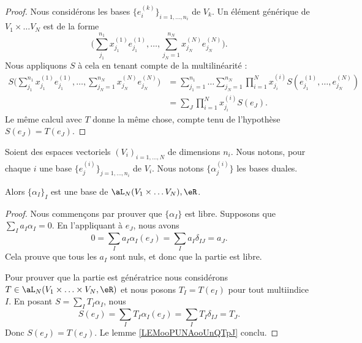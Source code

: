 \begin{proof}
	Nous considérons les bases \( \{ e^{(k)}_i \}_{i=1,\ldots,n_i}\) de \( V_k\). Un élément générique de \( V_1\times \ldots V_N\) est de la forme
	\begin{equation}
		\Big(  \sum_{j_1}^{n_1}x_{j_1}^{(1)}e^{(1)}_{j_1},\ldots, \sum_{j_N=1}^{n_N}x_{j_N}^{(N)}e_{j_N}^{(N)} \Big).
	\end{equation}
	Nous appliquons \( S\) à cela en tenant compte de la multilinéarité :
	\begin{subequations}
		\begin{align}
			S\Big(  \sum_{j_1}^{n_1}x_{j_1}^{(1)}e^{(1)}_{j_1},\ldots, \sum_{j_N=1}^{n_N}x_{j_N}^{(N)}e_{j_N}^{(N)} \Big) & =\sum_{j_1=1}^{n_1}\ldots \sum_{j_N=1}^{n_N}\prod_{i=1}^Nx_{j_i}^{(i)}S(e^{(1)}_{j_1},\ldots,e_{j_N}^{(N)}) \\
			                                                                                                              & =\sum_J\prod_{i=1}^Nx_{j_i}^{(i)}S(e_J).
		\end{align}
	\end{subequations}
	Le même calcul avec \( T\) donne la même chose, compte tenu de l'hypothèse \( S(e_J)=T(e_J)\).
\end{proof}

\begin{theorem}		\label{THOooTAGKooDscwFG}
	Soient des espaces vectoriels \( (V_i)_{i=1,\ldots,N}\) de dimensions \( n_i\). Nous notons, pour chaque \( i\) une base \( \{ e_j^{(i)}\}_{j=1,\ldots,n_i} \) de \( V_i\). Nous notons \( \{ \alpha_j^{(i)} \}\) les bases duales.

	Alors \( \{ \alpha_I \}_I\) est une base de \( \aL_N(V_1\times \ldots V_N),\eR\).
\end{theorem}

\begin{proof}
	Nous commençons par prouver que \( \{ \alpha_I \}\) est libre. Supposons que \( \sum_Ia_I\alpha_I=0\). En l'appliquant à \( e_J\), nous avons
	\begin{equation}
		0=\sum_Ia_I\alpha_I(e_J)=\sum_{I}a_I\delta_{IJ}=a_J.
	\end{equation}
	Cela prouve que tous les \( a_I\) sont nuls, et donc que la partie est libre.

	Pour prouver que la partie est génératrice nous considérons \( T\in \aL_N(V_1\times\ldots\times V_N,\eR)\) et nous posons \( T_I=T(e_I)\) pour tout multiindice \( I\). En posant \( S=\sum_IT_I\alpha_I\), nous
	\begin{equation}
		S(e_J)=\sum_{I}T_I\alpha_I(e_J)=\sum_IT_I\delta_{IJ}=T_J.
	\end{equation}
	Donc \( S(e_J)=T(e_J)\). Le lemme \ref{LEMooPUNAooUnQTpJ} conclu.
\end{proof}

